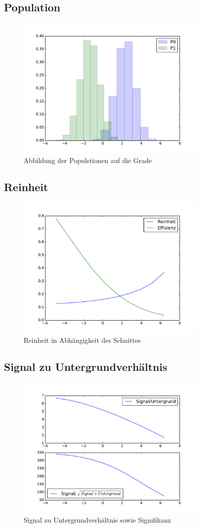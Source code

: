 \subsection*{Population}
\begin{figure}[H]
  \centering
  \includegraphics[height=7cm]{./Figures/firstHist.pdf}
  \caption{Abbildung der Populstionen auf die Grade}
\end{figure}
\subsection*{Reinheit}
\begin{figure}[H]
  \centering
  \includegraphics[height=7cm]{./Figures/reinheit1.pdf}
  \caption{Reinheit in Abhängigkeit des Schnittes}
\end{figure}
\subsection*{Signal zu Untergrundverhältnis}
\begin{figure}[H]
  \centering
  \includegraphics[height=7cm]{./Figures/SigZuUnt1.pdf}
  \caption{Signal zu Untergrundverhältnis sowie Signifikanz}
\end{figure}


